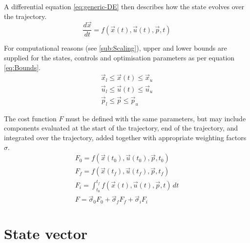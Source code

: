 A differential equation \eqref{eq:generic-DE} then describes how the state evolves over the trajectory.
\begin{equation}\label{eq:generic-DE}
\frac{d\vec{x}}{dt} = f(\vec{x}(t),\vec{u}(t),\vec{p},t)
\end{equation}

For computational reasons (see \autoref{sub:Scaling}), upper and lower bounds are supplied for the states, controls and optimisation parameters as per equation \eqref{eq:Bounds}.
\begin{subequations} \label{eq:Bounds}
\begin{gather}
\vec{x}_l\le\vec{x}(t)\le\vec{x}_u \label{eq:state-bounds}\\
\vec{u}_l\le\vec{u}(t)\le\vec{u}_u \label{eq:control-bounds}\\
\vec{p}_l\le\vec{p}\le\vec{p}_u \label{eq:parameter-bounds}
\end{gather}
\end{subequations}

The cost function $F$ must be defined with the same parameters, but may include components evaluated at the start of the trajectory, end of the trajectory, and integrated over the trajectory, added together with appropriate weighting factors $\sigma$.
\begin{subequations}
\begin{gather}
F_0=f(\vec{x}(t_0),\vec{u}(t_0),\vec{p},t_0) \label{eq:init-cost}\\
F_f=f(\vec{x}(t_f),\vec{u}(t_f),\vec{p},t_f) \label{eq:final-cost}\\
F_i=\int^{t_f}_{t_0}f(\vec{x}(t),\vec{u}(t),\vec{p},t)\,dt \label{eq:integral-cost} \\
F = \vec\sigma_0 F_0+\vec\sigma_f F_f+\vec\sigma_i F_i \label{eq:total-cost}
\end{gather}
\end{subequations}

\section{State vector} \label{sec:state-vector}


